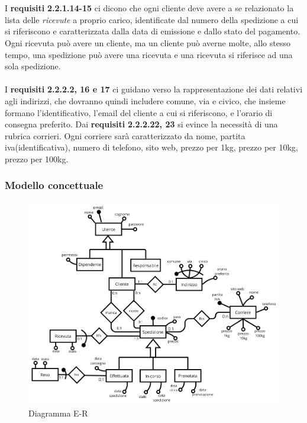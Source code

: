 \\\\
I \textbf{requisiti} \textbf{2.2.1.14-15} ci dicono che ogni cliente deve avere a se relazionato la lista delle \textit{ricevute} a proprio carico, identificate dal numero della spedizione a cui si riferiscono e caratterizzata dalla data di emissione e dallo stato del pagamento. Ogni ricevuta può avere un cliente, ma un cliente può averne molte, allo stesso tempo, una spedizione può avere una ricevuta e una ricevuta si riferisce ad una sola spedizione.
\\\\
I \textbf{requisiti} \textbf{2.2.2.2, 16 e 17} ci guidano verso la rappresentazione dei dati relativi agli indirizzi, che dovranno quindi includere comune, via e civico, che insieme formano l'identificativo, l'email del cliente a cui si riferiscono, e l'orario di consegna preferito.
Dai \textbf{requisiti} \textbf{2.2.2.22, 23} si evince la necessità di una rubrica corrieri. Ogni corriere sarà caratterizzato da nome, 
partita iva(identificativa), numero di telefono, sito web, prezzo per 1kg, prezzo per 10kg, prezzo per 100kg.

\subsubsection{Modello concettuale}
\begin{figure}[H]
  \centering
  \includegraphics[width=\textwidth]{assets/ER_diagram.png}
  \caption{Diagramma E-R}
\end{figure}
